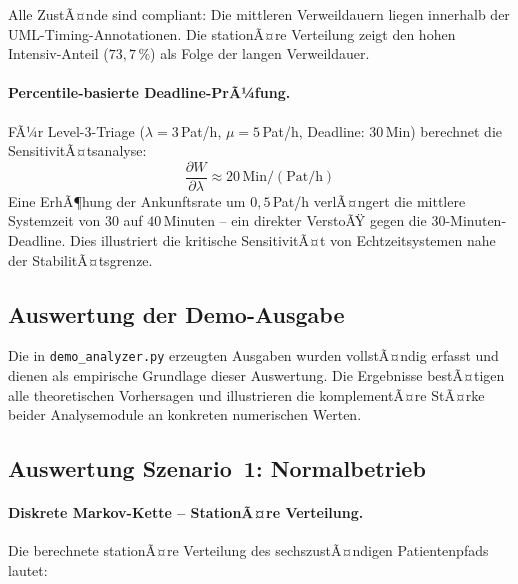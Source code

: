 ﻿\documentclass[a4paper,12pt]{report}
\theoremstyle{definition}
\begin{document}
Alle ZustÃ¤nde sind compliant: Die mittleren Verweildauern liegen innerhalb
der UML-Timing-Annotationen. Die stationÃ¤re Verteilung zeigt den hohen
Intensiv-Anteil ($73{,}7\,\%$) als Folge der langen Verweildauer.

\paragraph{Percentile-basierte Deadline-PrÃ¼fung.}
FÃ¼r Level-3-Triage ($\lambda = 3$\,Pat/h, $\mu = 5$\,Pat/h,
Deadline: 30\,Min) berechnet die SensitivitÃ¤tsanalyse:
\begin{equation}
	\frac{\partial W}{\partial \lambda} \approx 20\,\text{Min}/(\text{Pat/h})
\end{equation}
Eine ErhÃ¶hung der Ankunftsrate um $0{,}5$\,Pat/h verlÃ¤ngert die
mittlere Systemzeit von $30$ auf $40$\,Minuten -- ein direkter VerstoÃŸ
gegen die 30-Minuten-Deadline. Dies illustriert die kritische SensitivitÃ¤t
von Echtzeitsystemen nahe der StabilitÃ¤tsgrenze.

\subsection{Auswertung der Demo-Ausgabe}
\label{sec:demo-auswertung}

Die in \texttt{demo\_analyzer.py} erzeugten Ausgaben wurden vollstÃ¤ndig
erfasst und dienen als empirische Grundlage dieser Auswertung. Die Ergebnisse
bestÃ¤tigen alle theoretischen Vorhersagen und illustrieren die komplementÃ¤re
StÃ¤rke beider Analysemodule an konkreten numerischen Werten.

\subsection{Auswertung Szenario~1: Normalbetrieb}

\paragraph{Diskrete Markov-Kette -- StationÃ¤re Verteilung.}
Die berechnete stationÃ¤re Verteilung des sechszustÃ¤ndigen Patientenpfads
lautet:
\end{document}
